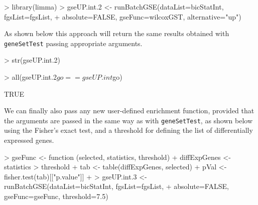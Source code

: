 \documentclass[11pt]{article}
\newcommand{\Rfunction}[1]{{\texttt{#1}}}
\begin{document}
\begin{Schunk}
\begin{Sinput}
> library(limma)
> gseUP.int.2 <- runBatchGSE(dataList=bicStatInt, fgsList=fgsList,
+ 				 absolute=FALSE, gseFunc=wilcoxGST, alternative="up")
\end{Sinput}
\end{Schunk}

As shown below this approach will return the same results
obtained with \Rfunction{geneSetTest} passing appropriate arguments.

\begin{Schunk}
\begin{Sinput}
> str(gseUP.int.2)
\end{Sinput}
\begin{Sinput}
> all(gseUP.int.2$go==gseUP.int$go)
\end{Sinput}
\begin{Soutput}
[1] TRUE
\end{Soutput}
\end{Schunk}

We can finally also pass any new user-defined enrichment function,
provided that the arguments are passed in the same way as with
\Rfunction{geneSetTest}, as shown below using the Fisher's exact test,
and a  threshold for defining the list of differentially expressed genes.

\begin{Schunk}
\begin{Sinput}
> gseFunc <- function (selected, statistics, threshold) {
+ 	diffExpGenes <- statistics > threshold
+ 	tab <- table(diffExpGenes, selected)
+ 	pVal <- fisher.test(tab)[["p.value"]]
+ 	}
> gseUP.int.3 <- runBatchGSE(dataList=bicStatInt, fgsList=fgsList,
+ 				 absolute=FALSE, gseFunc=gseFunc, threshold=7.5)
\end{Sinput}
\end{Schunk}
\end{document}
